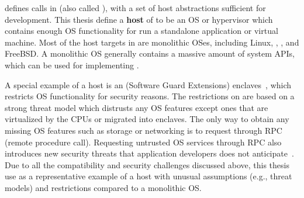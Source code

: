  

\graphene{} defines \palcallnum{} calls in \thehostabi{} (also called \hostapis{}),
with a set of host abstractions
sufficient for \libos{} development.
This thesis define
a {\bf host} of \thehostabi{}
to be an OS or hypervisor
which contains enough OS functionality for run a standalone application or virtual machine.
Most of the host targets in \graphene{}
are monolithic OSes,
including Linux, \win{}, \osx{}, and FreeBSD.
A monolithic OS generally
contains a massive amount of system APIs,
which can be used for
implementing \thehostabi{}.


A special example of a host
is an \sgx{} (Software Guard Extensions) enclaves~\cite{intelsgx},
which
restricts OS functionality for security reasons.
The restrictions on \sgx{}
are based on a strong threat model
which distrusts any OS features except ones that are virtualized by the CPUs or migrated into enclaves.
The only way to obtain any missing OS features such as storage or networking
is to request through RPC (remote procedure call).
Requesting untrusted OS services through RPC also introduces new security threats that application developers does not anticipate~\cite{checkoway13iago,osdi16scone}.
Due to all the compatibility and security challenges discussed above,
this thesis use \sgx{} as a representative example of a host
with unusual assumptions (e.g., threat models) and restrictions
compared to a monolithic OS.




